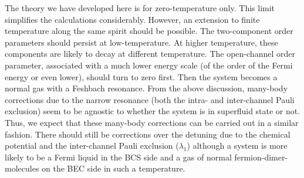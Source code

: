       
\begin{unsure}
The theory we have developed here is for zero-temperature only. This limit simplifies the calculations considerably.  However, an extension to finite temperature along the same spirit should be possible.  The two-component order parameters should persist at low-temperature.  At higher temperature, these components  are likely to decay at different temperature.  The open-channel order parameter, associated with a much lower energy scale (of the order of  the Fermi energy or even lower), should turn to zero first.  Then the system becomes a normal gas with a Feshbach resonance.  From the above discussion, many-body corrections due to the narrow resonance (both the intra- and inter-channel Pauli exclusion) seem to be agnostic to whether the system is in superfluid state or not.  Thus, we expect that these many-body corrections can be carried out in a similar fashion.   There should still be corrections over the detuning due to the chemical potential and the  inter-channel Pauli exclusion ($\lambda_{1}$) although a system is more likely to be a Fermi liquid in the BCS side and a gas of normal fermion-dimer-molecules on the BEC side in such a temperature.   
\end{unsure}
